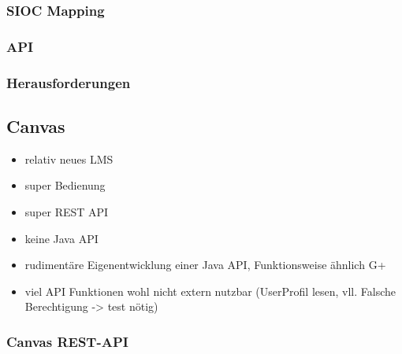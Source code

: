 \subsubsection{SIOC Mapping} %
\label{ssub:youtube_sioc_mapping}

\subsubsection{API} %
\label{ssub:youtube_api}

\subsubsection{Herausforderungen} %
\label{ssub:youtube_herausforderungen}





\subsection{Canvas} %
\label{sub:canvas_connector}

\begin{itemize}
    \item relativ neues LMS
    \item super Bedienung
    \item super REST API
    \item keine Java API
    \item rudimentäre Eigenentwicklung einer Java API, Funktionsweise ähnlich  G+
    \item viel API Funktionen wohl nicht extern nutzbar (UserProfil lesen, vll. Falsche Berechtigung -> test nötig)
\end{itemize}

\subsubsection{Canvas REST-API} %
\label{ssub:canvas_api}

